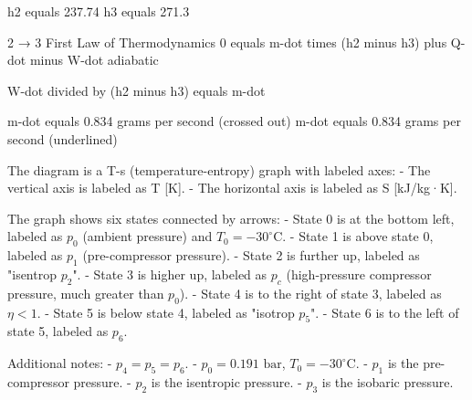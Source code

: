 h2 equals 237.74  
h3 equals 271.3  

2 → 3 First Law of Thermodynamics  
0 equals m-dot times (h2 minus h3) plus Q-dot minus W-dot  
adiabatic  

W-dot divided by (h2 minus h3) equals m-dot  

m-dot equals 0.834 grams per second (crossed out)  
m-dot equals 0.834 grams per second (underlined)

The diagram is a T-s (temperature-entropy) graph with labeled axes:  
- The vertical axis is labeled as T [K].  
- The horizontal axis is labeled as S [kJ/kg·K].  

The graph shows six states connected by arrows:  
- State 0 is at the bottom left, labeled as \( p_0 \) (ambient pressure) and \( T_0 = -30^\circ \text{C} \).  
- State 1 is above state 0, labeled as \( p_1 \) (pre-compressor pressure).  
- State 2 is further up, labeled as "isentrop \( p_2 \)".  
- State 3 is higher up, labeled as \( p_c \) (high-pressure compressor pressure, much greater than \( p_0 \)).  
- State 4 is to the right of state 3, labeled as \( \eta < 1 \).  
- State 5 is below state 4, labeled as "isotrop \( p_5 \)".  
- State 6 is to the left of state 5, labeled as \( p_6 \).  

Additional notes:  
- \( p_4 = p_5 = p_6 \).  
- \( p_0 = 0.191 \text{ bar} \), \( T_0 = -30^\circ \text{C} \).  
- \( p_1 \) is the pre-compressor pressure.  
- \( p_2 \) is the isentropic pressure.  
- \( p_3 \) is the isobaric pressure.